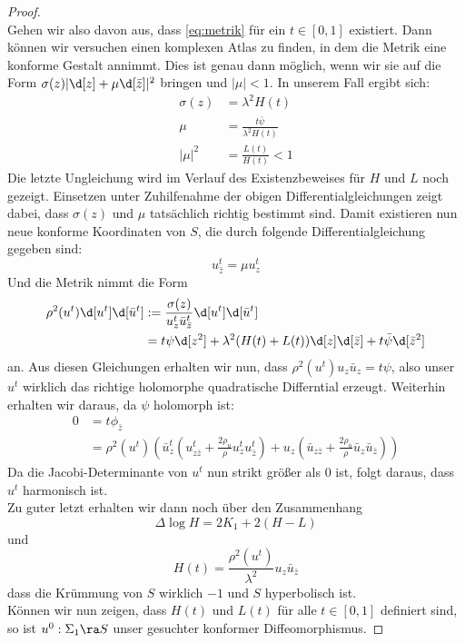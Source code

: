 \begin{proof}
  \\
  Gehen wir also davon aus, dass \eqref{eq:metrik} für ein $t\in [0,1]$ existiert. Dann können wir versuchen einen komplexen Atlas zu finden, in dem die Metrik eine konforme Gestalt annimmt. Dies ist genau dann möglich, wenn wir sie auf die Form $\sigma(z) | \d[z] + \mu \d[\bar z] |^2$ bringen und $|\mu| < 1$. In unserem Fall ergibt sich:
  \begin{align*}
    \sigma(z) & = \lambda^2 H(t) \\
    \mu & = \frac{t\bar \psi}{\lambda^2 H(t)}\\
    |\mu|^2 & = \frac{L(t)}{H(t)} < 1
  \end{align*}
  Die letzte Ungleichung wird im Verlauf des Existenzbeweises für $H$ und $L$ noch gezeigt. Einsetzen unter Zuhilfenahme der obigen Differentialgleichungen zeigt dabei, dass $\sigma(z)$ und $\mu$ tatsächlich richtig bestimmt sind. Damit existieren nun neue konforme Koordinaten von $S$, die durch folgende Differentialgleichung gegeben sind:
  \[
  u^t_{\bar z} = \mu u^t_z
  \]
  Und die Metrik nimmt die Form
  \begin{align*}
    \rho^2(u^t)\d[u^t]\d[\bar u^t] & := \frac{\sigma(z)}{u^t_z \bar u^t_{\bar z}} \d[u^t]\d[\bar u^t] \\
    & = t \psi \d[z^2] + \lambda^2(H(t) + L(t))\d[z]\d[\bar z] + t \bar \psi \d[\bar z^2]
  \end{align*}
  an. Aus diesen Gleichungen erhalten wir nun, dass $\rho^2(u^t)u_z \bar u_z = t \psi$, also unser $u^t$ wirklich das richtige holomorphe quadratische Differntial erzeugt. Weiterhin erhalten wir daraus, da $\psi$ holomorph ist:
  \begin{align*}
    0 & = t \phi_{\bar z}\\
    & = \rho^2(u^t) \left ( \bar u^t_z ( u^t_{z\bar z}  + \frac{2 \rho_u}{\rho} u^t_z u^t_{\bar z}) + u_z ( \bar u_{z\bar z} + \frac{2 \rho_{\bar u}}{\rho} \bar u_z \bar u_{\bar z} ) \right )
  \end{align*}
  Da die Jacobi-Determinante von $u^t$ nun strikt größer als 0 ist, folgt daraus, dass $u^t$ harmonisch ist. \\
  Zu guter letzt erhalten wir dann noch über den Zusammenhang 
  \[
  \Delta \log H = 2 K_1 + 2(H-L)
  \]
  und
  \[
  H(t) = \frac{\rho^2(u^t)}{\lambda^2} u_z \bar u_{\bar z}
  \]
  dass die Krümmung von $S$ wirklich $-1$ und $S$ hyperbolisch ist. \\
  Können wir nun zeigen, dass $H(t)$ und $L(t)$ für alle $t \in [0,1]$ definiert sind, so ist $u^0 : \Sigma_1 \ra S$ unser gesuchter konformer Diffeomorphismus.


\end{proof}
